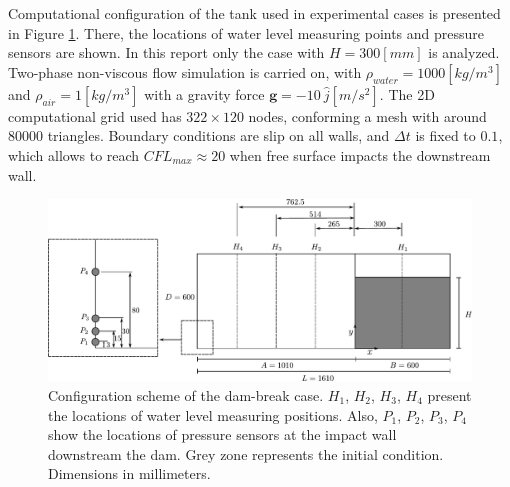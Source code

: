 \documentclass[a4paper,conference]{IEEEtran}
\begin{document}
Computational configuration of the tank used in experimental cases is presented in Figure \ref{fg:dambreak-config}. There, the locations of water level measuring points and pressure sensors are shown. In this report only the case with $H=300[mm]$ is analyzed. Two-phase non-viscous flow simulation is carried on, with $\rho_{water}=1000[kg/m^3]$ and $\rho_{air}=1[kg/m^3]$ with a gravity force $\mathbf{g}=-10\ \hat{j} [m/s^2]$. The 2D computational grid used has $322\times120$ nodes, conforming a mesh with around $80000$ triangles. Boundary conditions are slip on all walls, and $\Delta t$ is fixed to $0.1$, which allows to reach $CFL_{max}\approx20$ when free surface impacts the downstream wall. 

\begin{figure}[htbp]
  \begin{center}
      \includegraphics[width=\columnwidth]{images/dam_break_config.pdf}
  \end{center}
  \caption{\label{fg:dambreak-config} Configuration scheme of the dam-break case. $H_1$, $H_2$, $H_3$, $H_4$ present the locations of water level measuring positions. Also, $P_1$, $P_2$, $P_3$, $P_4$ show the locations of pressure sensors at the impact wall downstream the dam. Grey zone represents the initial condition. Dimensions in millimeters.}
\end{figure}
\end{document}
